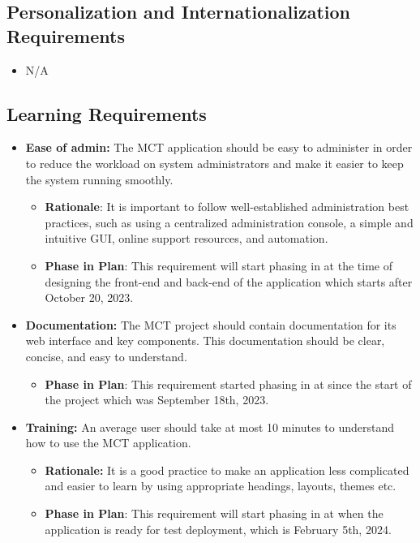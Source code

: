 \documentclass[12pt]{article}
\begin{document}
\subsection{Personalization and Internationalization Requirements}
\begin{itemize}
    \item N/A
\end{itemize}
\subsection{Learning Requirements}
\begin{itemize}
    \item 
\textbf{Ease of admin:} The MCT application should be easy to administer in order to reduce the workload on system administrators and make it easier to keep the system running smoothly.
\begin{itemize}
    \item \textbf{Rationale}: It is important to follow well-established administration best practices, such as using a centralized administration console, a simple and intuitive GUI, online support resources, and automation.
    \item \textbf{Phase in Plan}: This requirement will start phasing in at the time of designing the front-end and back-end of the application which starts after October 20, 2023.
\end{itemize}
\item 
\textbf{Documentation: }The MCT project should contain documentation for its web interface and key components. This documentation should be clear, concise, and easy to understand.
\begin{itemize}
    \item \textbf{Phase in Plan}: This requirement started phasing in at since the start of the project which was September 18th, 2023.
\end{itemize}
\item 
\textbf{Training: }An average user should take at most 10 minutes to understand how to use the MCT application.
\begin{itemize}
    \item \textbf{Rationale: }It is a good practice to make an application less complicated and easier to learn by using appropriate headings, layouts, themes etc.
    \item \textbf{Phase in Plan}: This requirement will start phasing in at when the application is ready for test deployment, which is February 5th, 2024.
\end{itemize}






\end{itemize}
\end{document}
